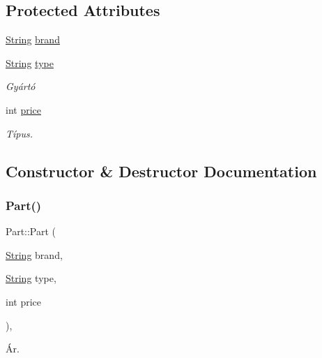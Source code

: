 \subsection*{Protected Attributes}
\begin{DoxyCompactItemize}
\item 
\mbox{\hyperlink{class_string}{String}} \mbox{\hyperlink{class_part_ae06f2fdeb7fbbdb229a7aca151f3e341}{brand}}
\item 
\mbox{\hyperlink{class_string}{String}} \mbox{\hyperlink{class_part_a101dbcc5c4b21564df7414c7eb0eae88}{type}}
\begin{DoxyCompactList}\small\item\em Gyártó \end{DoxyCompactList}\item 
int \mbox{\hyperlink{class_part_a8e71223aed1da95a974f33d8d6c91bb1}{price}}
\begin{DoxyCompactList}\small\item\em Típus. \end{DoxyCompactList}\end{DoxyCompactItemize}


\subsection{Constructor \& Destructor Documentation}
\mbox{\label{class_part_af4aa597f74d7f630166103dc8b050870}} 
\subsubsection{\texorpdfstring{Part()}{Part()}}
{\footnotesize\ttfamily Part\+::\+Part (\begin{DoxyParamCaption}\item[{\mbox{\hyperlink{class_string}{String}}}]{brand,  }\item[{\mbox{\hyperlink{class_string}{String}}}]{type,  }\item[{int}]{price }\end{DoxyParamCaption})\hspace{0.3cm}{\ttfamily [inline]}, {\ttfamily [explicit]}}



Ár. 

\mbox{\label{class_part_aaecbb747a7227f7ce3b44caeaf1801c2}} 
